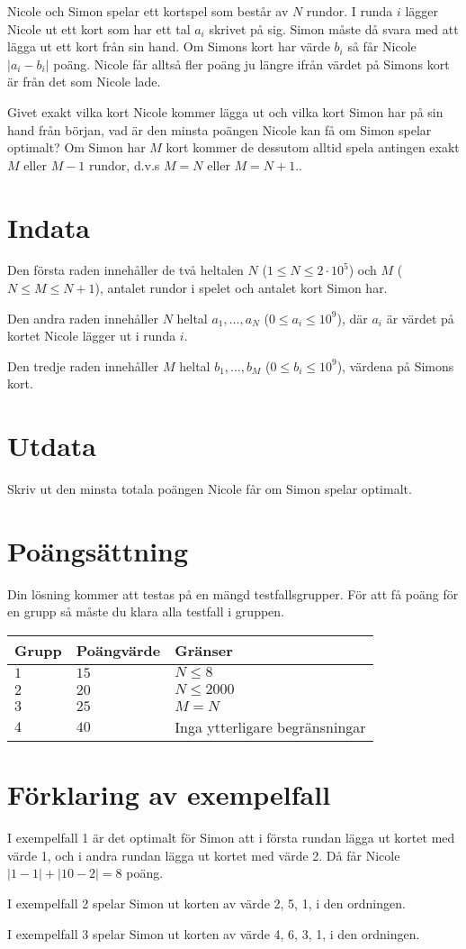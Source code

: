 Nicole och Simon spelar ett kortspel som består av $N$ rundor.
I runda $i$ lägger Nicole ut ett kort som har ett tal $a_i$ skrivet på sig.
Simon måste då svara med att lägga ut ett kort från sin hand.
Om Simons kort har värde $b_i$ så får Nicole $|a_i-b_i|$ poäng.
Nicole får alltså fler poäng ju längre ifrån värdet på Simons kort är från det som Nicole lade.

Givet exakt vilka kort Nicole kommer lägga ut och vilka kort Simon har på sin hand från början, vad är den minsta poängen Nicole kan få om Simon spelar optimalt?
Om Simon har $M$ kort kommer de dessutom alltid spela antingen exakt $M$ eller $M - 1$ rundor, d.v.s $M = N$ eller $M = N + 1$..

\section*{Indata}
Den första raden innehåller de två heltalen $N$ ($1\leq N \leq 2 \cdot 10^5$) och $M$ ($N\leq M \leq N+1$), antalet rundor i spelet och antalet kort Simon har.

Den andra raden innehåller $N$ heltal $a_1, \dots, a_N$ ($0\le a_i \le 10^9$), där $a_i$ är värdet på kortet Nicole lägger ut i runda $i$.

Den tredje raden innehåller $M$ heltal $b_1, \dots, b_M$ ($0\le b_i \le 10^9$), värdena på Simons kort.

\section*{Utdata}
Skriv ut den minsta totala poängen Nicole får om Simon spelar optimalt.

\section*{Poängsättning}
Din lösning kommer att testas på en mängd testfallsgrupper.
För att få poäng för en grupp så måste du klara alla testfall i gruppen.

\noindent
\begin{tabular}{| l | l | p{12cm} |}
  \hline
  Grupp & Poängvärde & Gränser \\ \hline
  $1$   & $15$       & $N \leq 8 $\\ \hline
  $2$   & $20$       & $N \leq 2000 $  \\ \hline
  $3$   & $25$       & $M=N$ \\ \hline
  $4$   & $40$       & Inga ytterligare begränsningar \\ \hline
\end{tabular}

\section*{Förklaring av exempelfall}
I exempelfall 1 är det optimalt för Simon att i första rundan lägga ut kortet med värde 1, och i andra rundan lägga ut kortet med värde 2. Då får Nicole $|1-1| + |10-2|=8$ poäng.

I exempelfall 2 spelar Simon ut korten av värde 2, 5, 1, i den ordningen.

I exempelfall 3 spelar Simon ut korten av värde 4, 6, 3, 1, i den ordningen.
